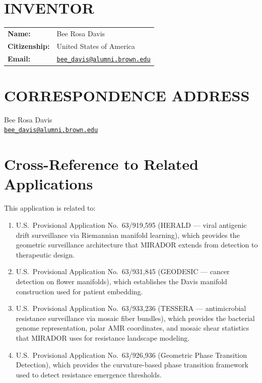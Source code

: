 \documentclass[11pt]{article}
\newcommand{\EmailLink}[1]{\href{mailto:#1}{\nolinkurl{#1}}}
\newcommand{\InventorName}{Bee Rosa Davis}
\begin{document}
\newpage

\section*{INVENTOR}
\begin{tabular}{@{}ll}
\textbf{Name:}        & \InventorName \\
\textbf{Citizenship:} & United States of America \\
\textbf{Email:}       & \EmailLink{bee_davis@alumni.brown.edu} \\
\end{tabular}

\section*{CORRESPONDENCE ADDRESS}
\InventorName \\
\EmailLink{bee_davis@alumni.brown.edu}

\section{Cross-Reference to Related Applications}

This application is related to:
\begin{enumerate}[label=(\arabic*), leftmargin=*]
    \item U.S.\ Provisional Application No.\ 63/919,595 (HERALD — viral antigenic drift
    surveillance via Riemannian manifold learning), which provides the geometric surveillance
    architecture that MIRADOR extends from detection to therapeutic design.
    \item U.S.\ Provisional Application No.\ 63/931,845 (GEODESIC — cancer detection on
    flower manifolds), which establishes the Davis manifold construction used for patient
    embedding.
    \item U.S.\ Provisional Application No.\ 63/933,236 (TESSERA — antimicrobial resistance
    surveillance via mosaic fiber bundles), which provides the bacterial genome representation,
    polar AMR coordinates, and mosaic shear statistics that MIRADOR uses for resistance
    landscape modeling.
    \item U.S.\ Provisional Application No.\ 63/926,936 (Geometric Phase Transition Detection),
    which provides the curvature-based phase transition framework used to detect resistance
    emergence thresholds.
\end{enumerate}
\end{document}
